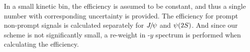 In a small kinetic bin, the efficiency \effTot is assumed to be constant, and thus a single number with corresponding uncertainty is provided.
The efficiency for prompt non-prompt signals is calculated separately for ${{J\mskip -3mu/\mskip -2mu\psi}}$ and ${\psi{(2S)}}$. And since our scheme is not significantly small, a re-weight in \pt-$y$ spectrum is performed when calculating the efficiency.

